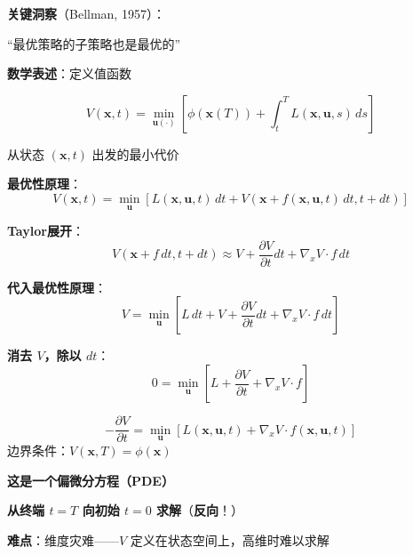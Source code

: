 \documentclass[12pt, a4paper]{ctexart}
\begin{document}
\begin{blackboard}

\textbf{关键洞察}（Bellman, 1957）：

``最优策略的子策略也是最优的''

\textbf{数学表述}：定义值函数

\[
V(\mathbf{x}, t) = \min_{\mathbf{u}(\cdot)} \left[ \phi(\mathbf{x}(T)) + \int_t^T L(\mathbf{x}, \mathbf{u}, s) \, ds \right]
\]

从状态 $(\mathbf{x}, t)$ 出发的最小代价

\textbf{最优性原理}：
\[
V(\mathbf{x}, t) = \min_{\mathbf{u}} \left[ L(\mathbf{x}, \mathbf{u}, t) \, dt + V(\mathbf{x} + f(\mathbf{x}, \mathbf{u}, t) \, dt, t + dt) \right]
\]

\end{blackboard}

\begin{blackboard}

\textbf{Taylor展开}：
\[
V(\mathbf{x} + f \, dt, t + dt) \approx V + \frac{\partial V}{\partial t} dt + \nabla_x V \cdot f \, dt
\]

\textbf{代入最优性原理}：
\[
V = \min_{\mathbf{u}} \left[ L \, dt + V + \frac{\partial V}{\partial t} dt + \nabla_x V \cdot f \, dt \right]
\]

\textbf{消去 $V$，除以 $dt$}：
\[
0 = \min_{\mathbf{u}} \left[ L + \frac{\partial V}{\partial t} + \nabla_x V \cdot f \right]
\]

\end{blackboard}

\begin{blackboard}

\begin{keypoint}[HJB方程]
\[
\boxed{-\frac{\partial V}{\partial t} = \min_{\mathbf{u}} \left[ L(\mathbf{x}, \mathbf{u}, t) + \nabla_x V \cdot f(\mathbf{x}, \mathbf{u}, t) \right]}
\]
边界条件：$V(\mathbf{x}, T) = \phi(\mathbf{x})$
\end{keypoint}

\textbf{这是一个偏微分方程（PDE）}

\textbf{从终端 $t = T$ 向初始 $t = 0$ 求解}（\textbf{反向}！）

\textbf{难点}：维度灾难——$V$ 定义在状态空间上，高维时难以求解

\end{blackboard}
\end{document}
